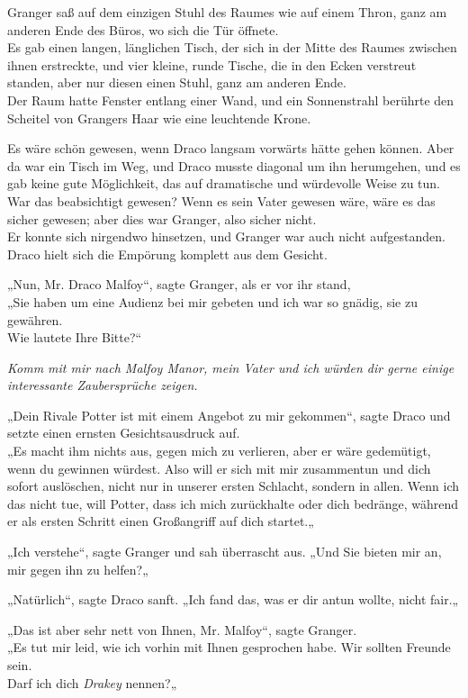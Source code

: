 {Granger saß auf dem einzigen Stuhl des Raumes wie auf einem Thron, ganz am anderen Ende des Büros, wo sich die Tür öffnete.\\ Es gab einen langen, länglichen Tisch, der sich in der Mitte des Raumes zwischen ihnen erstreckte, und vier kleine, runde Tische, die in den Ecken verstreut standen, aber nur diesen einen Stuhl, ganz am anderen Ende.\\ Der Raum hatte Fenster entlang einer Wand, und ein Sonnenstrahl berührte den Scheitel von Grangers Haar wie eine leuchtende Krone.

Es wäre schön gewesen, wenn Draco langsam vorwärts hätte gehen können. Aber da war ein Tisch im Weg, und Draco musste diagonal um ihn herumgehen, und es gab keine gute Möglichkeit, das auf dramatische und würdevolle Weise zu tun.\\ War das beabsichtigt gewesen? Wenn es sein Vater gewesen wäre, wäre es das sicher gewesen; aber dies war Granger, also sicher nicht.\\ Er konnte sich nirgendwo hinsetzen, und Granger war auch nicht aufgestanden. Draco hielt sich die Empörung komplett aus dem Gesicht.

„Nun, Mr. Draco Malfoy“, sagte Granger, als er vor ihr stand,\\ „Sie haben um eine Audienz bei mir gebeten und ich war so gnädig, sie zu gewähren.\\ Wie lautete Ihre Bitte?“

\emph{Komm mit mir nach Malfoy Manor, mein Vater und ich würden dir gerne einige interessante Zaubersprüche zeigen.}

„Dein Rivale Potter ist mit einem Angebot zu mir gekommen“, sagte Draco und setzte einen ernsten Gesichtsausdruck auf.\\ „Es macht ihm nichts aus, gegen mich zu verlieren, aber er wäre gedemütigt, wenn du gewinnen würdest. Also will er sich mit mir zusammentun und dich sofort auslöschen, nicht nur in unserer ersten Schlacht, sondern in allen. Wenn ich das nicht tue, will Potter, dass ich mich zurückhalte oder dich bedränge, während er als ersten Schritt einen Großangriff auf dich startet.„

„Ich verstehe“, sagte Granger und sah überrascht aus. „Und Sie bieten mir an, mir gegen ihn zu helfen?„

„Natürlich“, sagte Draco sanft. „Ich fand das, was er dir antun wollte, nicht fair.„

„Das ist aber sehr nett von Ihnen, Mr. Malfoy“, sagte Granger.\\ „Es tut mir leid, wie ich vorhin mit Ihnen gesprochen habe. Wir sollten Freunde sein.\\ Darf ich dich \emph{Drakey} nennen?„

}
